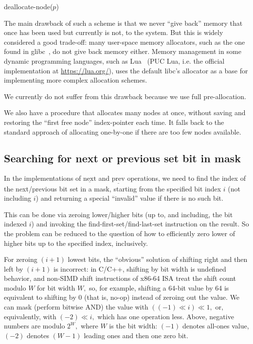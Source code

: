 \documentclass[a4paper,12pt]{article}
\begin{document}
\begin{procedure}[H]
\DontPrintSemicolon
\caption{deallocate-node($p$)}
\end{procedure}

The main drawback of such a scheme is that we never ``give back'' memory that once has been used but currently is not, to the system.
But this is widely considered a good trade-off: many user-space memory allocators, such as the one found in glibc~\cite{mem_glibc},
do not give back memory either.
Memory management in some dynamic programming languages,
such as Lua~\cite{mem_lua} (PUC Lua, i.e. the official implementation at \url{https://lua.org/}),
uses the default libc's allocator as a base for implementing more complex allocation schemes.

We currently do not suffer from this drawback because we use full pre-allocation.

We also have a procedure that allocates many nodes at once, without saving and restoring the ``first free node'' index-pointer each time.
It falls back to the standard approach of allocating one-by-one if there are too few nodes available.

\subsection{Searching for next or previous set bit in mask}

In the implementations of $\underline{\mathrm{next}}$ and $\underline{\mathrm{prev}}$ operations,
we need to find the index of the next/previous bit set in a mask, starting from the specified bit index $i$
(not including $i$) and returning a special ``invalid'' value if there is no such bit.

This can be done via zeroing lower/higher bits (up to, and including, the bit indexed $i$)
and invoking the find-first-set/find-last-set instruction on the result.
So the problem can be reduced to the question of how to efficiently zero lower of higher bits up to the specified index, inclusively.

For zeroing $(i+1)$ lowest bits,
the ``obvious'' solution of shifting right and then left by $(i+1)$ is incorrect:
in C/C++, shifting by bit width is undefined behavior, and non-SIMD
shift instructions of x86-64 ISA treat the shift count modulo $W$ for bit width $W,$
so, for example, shifting a 64-bit value by 64 is equivalent to shifting by $0$
(that is, no-op) instead of zeroing out the value.
We can mask (perform bitwise AND) the value with $((-1) \ll i) \ll 1,$
or, equivalently, with $(-2) \ll i,$
which has one operation less. Above, negative numbers are modulo $2^W,$
where $W$ is the bit width: $(-1)$ denotes all-ones value, $(-2)$ denotes $(W-1)$ leading ones and then one zero bit.
\end{document}
